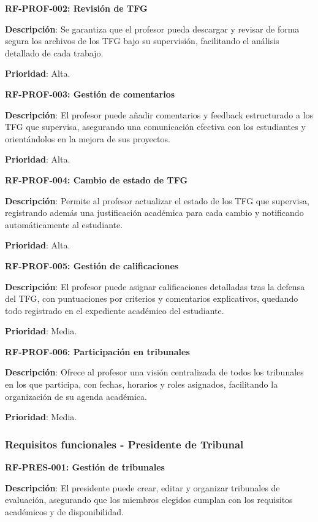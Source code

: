 \documentclass[12pt,a4paper,oneside]{report}
\begin{document}
\textbf{RF-PROF-002: Revisión de TFG}

\textbf{Descripción}: Se garantiza que el profesor pueda descargar y revisar de forma segura los archivos de los TFG bajo su supervisión, facilitando el análisis detallado de cada trabajo.

\textbf{Prioridad}: Alta.

\textbf{RF-PROF-003: Gestión de comentarios}

\textbf{Descripción}: El profesor puede añadir comentarios y feedback estructurado a los TFG que supervisa, asegurando una comunicación efectiva con los estudiantes y orientándolos en la mejora de sus proyectos.

\textbf{Prioridad}: Alta.

\textbf{RF-PROF-004: Cambio de estado de TFG}

\textbf{Descripción}: Permite al profesor actualizar el estado de los TFG que supervisa, registrando además una justificación académica para cada cambio y notificando automáticamente al estudiante.

\textbf{Prioridad}: Alta.

\textbf{RF-PROF-005: Gestión de calificaciones}

\textbf{Descripción}: El profesor puede asignar calificaciones detalladas tras la defensa del TFG, con puntuaciones por criterios y comentarios explicativos, quedando todo registrado en el expediente académico del estudiante.

\textbf{Prioridad}: Media.

\textbf{RF-PROF-006: Participación en tribunales}

\textbf{Descripción}: Ofrece al profesor una visión centralizada de todos los tribunales en los que participa, con fechas, horarios y roles asignados, facilitando la organización de su agenda académica.

\textbf{Prioridad}: Media.

\subsubsection{Requisitos funcionales - Presidente de
Tribunal}\label{requisitos-funcionales---presidente-de-tribunal}

\textbf{RF-PRES-001: Gestión de tribunales}

\textbf{Descripción}: El presidente puede crear, editar y organizar tribunales de evaluación, asegurando que los miembros elegidos cumplan con los requisitos académicos y de disponibilidad.
\end{document}
